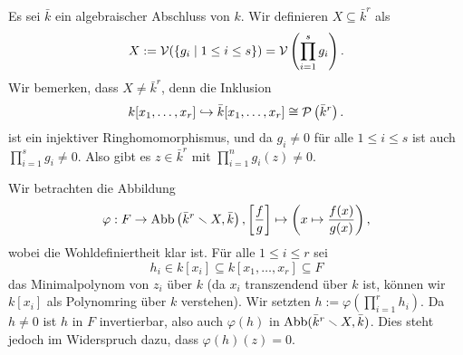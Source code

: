 \documentclass[a4paper,10pt]{article}
\begin{document}
Es sei $\bar{k}$ ein algebraischer Abschluss von $k$. Wir definieren $X \subseteq \bar{k}^r$ als
\[
 X := \mathcal{V}(\{g_i \mid 1 \leq i \leq s\}) = \mathcal{V}\left(\prod_{i=1}^s g_i\right).
\]
Wir bemerken, dass $X \neq \bar{k}^r$, denn die Inklusion
\[
 k[x_1, \ldots, x_r] \hookrightarrow \bar{k}[x_1, \ldots, x_r] \cong \mathcal{P}\left(\bar{k}^r\right).
\]
ist ein injektiver Ringhomomorphismus, und da $g_i \neq 0$ für alle $1 \leq i \leq s$ ist auch $\prod_{i=1}^s g_i \neq 0$. Also gibt es $z \in \bar{k}^r$ mit $\prod_{i=1}^n g_i (z) \neq 0$.

Wir betrachten die Abbildung
\[
 \varphi : F \to \operatorname{Abb}\left(\bar{k}^r \smallsetminus X, \bar{k}\right),
 \left[ \frac{f}{g} \right] \mapsto \left( x \mapsto \frac{f(x)}{g(x)} \right),
\]
wobei die Wohldefiniertheit klar ist. Für alle $1 \leq i \leq r$ sei
\[
 h_i \in k[x_i] \subseteq k[x_1, \ldots, x_r] \subseteq F
\]
das Minimalpolynom von $z_i$ über $k$ (da $x_i$ transzendend über $k$ ist, können wir $k[x_i]$ als Polynomring über $k$ verstehen). Wir setzten $h := \varphi(\prod_{i=1}^r h_i)$. Da $h \neq 0$ ist $h$ in $F$ invertierbar, also auch $\varphi(h)$ in $\operatorname{Abb}(\bar{k}^r \smallsetminus X, \bar{k})$. Dies steht jedoch im Widerspruch dazu, dass $\varphi(h)(z) = 0$.
\end{document}
